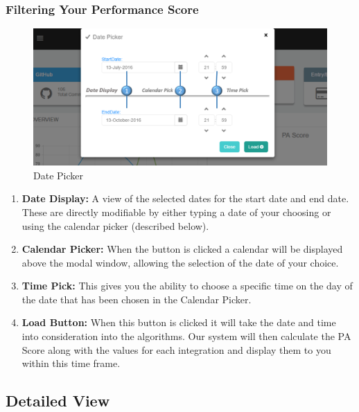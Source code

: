 \documentclass[11pt,a4paper]{article}
\begin{document}
\subsubsection{Filtering Your Performance Score}
\begin{figure}[H]
	\begin{center}
		\includegraphics[scale=0.27]{../Images/Getting_Started/Date_Picker_Numbered}
		\caption{Date Picker}
	\end{center}
\end{figure}
\begin{enumerate}
	\item \textbf{Date Display:} A view of the selected dates for the start date and end date. These are directly modifiable by either typing a date of your choosing or using the calendar picker (described below).
	\item \textbf{Calendar Picker:} When the button is clicked a calendar will be displayed above the modal window, allowing the selection of the date of your choice. 
	\item \textbf{Time Pick:} This gives you the ability to choose a specific time on the day of the date that has been chosen in the Calendar Picker. 
	\item \textbf{Load Button:} When this button is clicked it will take the date and time into consideration into the algorithms. Our system will then calculate the PA Score along with the values for each integration and display them to you within this time frame. 
\end{enumerate}

\subsection{Detailed View}
\end{document}
